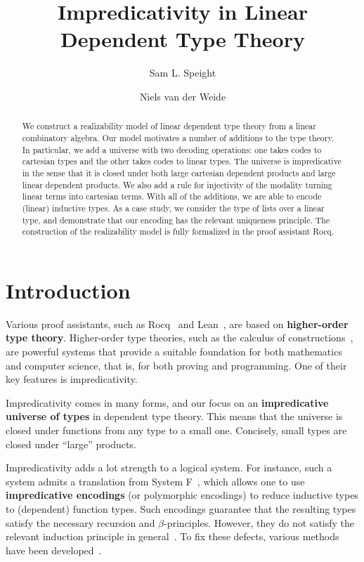 \documentclass[a4paper,UKenglish,cleveref,numberwithinsect, autoref, thm-restate]{lipics-v2021}
\title{Impredicativity in Linear Dependent Type Theory} %
\author{Sam L. Speight}{School of Computer Science, University of Birmingham, UK \and \url{https://slspeight.github.io/} }{s.l.speight@bham.ac.uk}{https://orcid.org/0009-0009-3706-9427}
{
This research was supported by the Engineering
and Physical Sciences Research Council grant EP/W034514/1
}
\author{Niels van der Weide}
{iCIS, Radboud University Nijmegen, The Netherlands \and \url{https://nmvdw.github.io}}
{nweide@cs.ru.nl}
{https://orcid.org/0000-0003-1146-4161}
{
This research was supported by the NWO project
``The Power of Equality'' OCENW.M20.380,
which is financed by the Dutch Research Council (NWO).
}
\begin{document}
\maketitle

\begin{abstract}
    We construct a realizability model of linear dependent type theory from a linear combinatory algebra. Our model motivates a number of additions to the type theory. In particular, we add a universe with two decoding operations: one takes codes to cartesian types and the other takes codes to linear types. The universe is impredicative in the sense that it is closed under both large cartesian dependent products and large linear dependent products. We also add a rule for injectivity of the modality turning linear terms into cartesian terms. With all of the additions, we are able to encode (linear) inductive types. As a case study, we consider the type of lists over a linear type, and demonstrate that our encoding has the relevant uniqueness principle. The construction of the realizability model is fully formalized in the proof assistant Rocq.
\end{abstract}

\section{Introduction}\label{sec:intro}
Various proof assistants,
such as Rocq~\cite{therocqdevelopmentteam:2025}
and Lean~\cite{demoura:2015}, are based on \textbf{higher-order type theory}.
Higher-order type theories, such as the calculus of constructions~\cite{coquand:1988a},
are powerful systems that provide a suitable foundation for both mathematics and computer science, that is, for both proving and programming.
One of their key features is impredicativity.

Impredicativity comes in many forms,
and our focus on an \textbf{impredicative universe of types} in dependent type theory.
This means that the universe is closed under functions from any type to a small one.
Concisely, small types are closed under ``large'' products.


Impredicativity adds a lot strength to a logical system.
For instance,
such a system admits a translation from System F~\cite{Girard1972,Reynolds1974},
which allows one to use \textbf{impredicative encodings} (or polymorphic encodings) to reduce inductive types to (dependent) function types.
Such encodings guarantee that the resulting types satisfy the necessary recursion and $\beta$-principles.
However, they do not satisfy the relevant induction principle in general~\cite{geuvers:2001,rummelhoff:2004}.
To fix these defects,
various methods have been developed~\cite{altenkirch:2024,awodey:2018,marmaduke:2023,wadler:2003,wadler:2007}.
\end{document}
